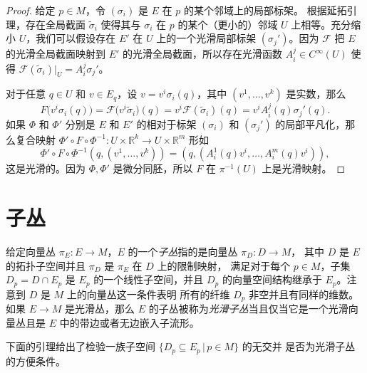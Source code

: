 \begin{proof}
  给定 $p\in M$，令 $(\sigma_i)$ 是 $E$ 在 $p$ 的某个邻域上的局部标架。
  根据延拓引理，存在全局截面 $\tilde{\sigma}_i$ 使得其与 $\sigma_i$ 在 $p$
  的某个（更小的）邻域 $U$ 上相等。充分缩小 $U$，我们可以假设存在
  $E'$ 在 $U$ 上的一个光滑局部标架 $(\sigma_j')$。因为 $\mathcal{F}$
  把 $E$ 的光滑全局截面映射到 $E'$ 的光滑全局截面，所以存在光滑函数
  $A_i^j\in C^\infty(U)$ 使得 $\mathcal{F}(\tilde{\sigma}_i)|_U=A_i^j\sigma_j'$。

  对于任意 $q\in U$ 和 $v\in E_q$，设 $v=v^i\sigma_i(q)$，其中 $(v^1,\dots,v^k)$
  是实数，那么
  \[
    F\bigl(v^i\sigma_i(q)\bigr)=\mathcal{F}\bigl(v^i\tilde{\sigma}_i\bigr)(q)
    =v^i \mathcal{F}(\tilde{\sigma}_i)(q)=v^iA_i^j(q)\sigma_j'(q).
  \]
  如果 $\varPhi$ 和 $\varPhi'$ 分别是 $E$ 和 $E'$ 的相对于标架 $(\sigma_i)$
  和 $(\sigma_j')$ 的局部平凡化，那么复合映射 $\varPhi'\circ F\circ \varPhi^{-1}:U\times \mathbb{R}^k\to U\times \mathbb{R}^m$
  形如
  \[
    \varPhi'\circ F\circ \varPhi^{-1}\left(
      q,\left(v^1,\dots,v^k\right)
    \right)=
    \left(q,\left(
      A_i^1(q)v^i,\dots,A^m_i(q)v^i
    \right)\right),
  \]
  这是光滑的。因为 $\varPhi,\varPhi'$ 是微分同胚，所以 $F$ 在 $\pi^{-1}(U)$ 上是光滑映射。
\end{proof}



\section{子丛}

给定向量丛 $\pi_E:E\to M$，$E$ 的一个\emph{子丛}指的是向量丛 $\pi_D:D\to M$，
其中 $D$ 是 $E$ 的拓扑子空间并且 $\pi_D$ 是 $\pi_E$ 在 $D$ 上的限制映射，
满足对于每个 $p\in M$，子集 $D_p=D\cap E_p$ 是 $E_p$ 的一个线性子空间，并且
$D_p$ 的向量空间结构继承于 $E_p$。注意到 $D$ 是 $M$ 上的向量丛这一条件表明
所有的纤维 $D_p$ 非空并且有同样的维数。如果 $E\to M$ 是光滑丛，那么
$E$ 的子丛被称为\emph{光滑子丛}当且仅当它是一个光滑向量丛且是 $E$
中的带边或者无边嵌入子流形。

下面的引理给出了检验一族子空间 $\{D_p\subseteq E_p\,|\, p\in M\}$ 的无交并 
是否为光滑子丛的方便条件。


